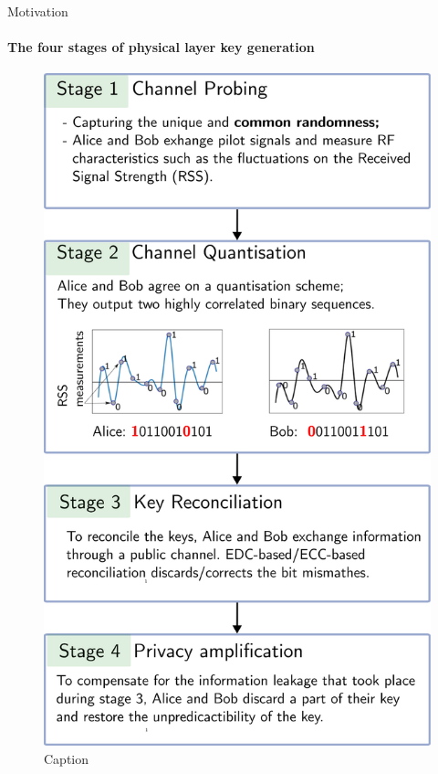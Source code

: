 \begin{frame}{Motivation}
\framesubtitle{The four stages of physical layer key generation}
\vspace{-.26cm}
\begin{figure}
    \centering
    \includegraphics[scale = 0.215]{slides/figures/PLKG.eps}
    \caption{Caption}
    \label{fig:PLKG}
\end{figure}
\end{frame}

